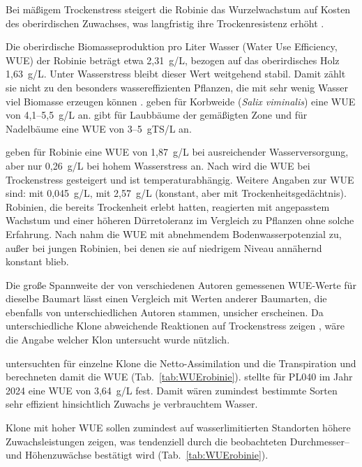 \documentclass[twocolumn]{scrartcl}
\begin{document}
Bei mäßigem Trockenstress steigert die Robinie das Wurzelwachstum auf Kosten des oberirdischen Zuwachses, was langfristig ihre Trockenresistenz erhöht \citep{yang2018robinie}.

Die oberirdische Biomasseproduktion pro Liter Wasser (Water Use Efficiency, WUE) der Robinie beträgt etwa 2,31~g/L, bezogen auf das oberirdisches Holz 1,63~g/L. Unter Wasserstress bleibt dieser Wert weitgehend stabil. Damit zählt sie nicht zu den besonders wassereffizienten Pflanzen, die mit sehr wenig Wasser viel Biomasse erzeugen können \citep{mantovani2014robinieWasser}. \citet{lindroth1994wasserverbrauchWeide} geben für Korbweide (\emph{Salix viminalis}) eine WUE von 4,1--5,5~g/L an.
\citet{lacher2001OekophysiologieDerPflanzen} gibt für Laubbäume der gemäßigten Zone und für Nadelbäume eine WUE von 3--5~gTS/L an.

\citet{ombodi2022robinieWasserverbrauch} geben für Robinie eine WUE von 1,87~g/L bei ausreichender Wasserversorgung, aber nur 0,26~g/L bei hohem Wasserstress an. Nach \citet{veste2013robinie} wird die WUE bei Trockenstress gesteigert und ist temperaturabhängig. Weitere Angaben zur WUE sind: \citet{raper1992robinieWasserverbrauch} mit 0,045~g/L, \citet{mantovani2014robinieWue} mit 2,57~g/L (konstant, aber mit Trockenheitsgedächtnis). Robinien, die bereits Trockenheit erlebt hatten, reagierten mit angepasstem Wachstum und einer höheren Dürretoleranz im Vergleich zu Pflanzen ohne solche Erfahrung.
Nach \citet{wang2007robinie} nahm die WUE mit abnehmendem Bodenwasserpotenzial zu, außer bei jungen Robinien, bei denen sie auf niedrigem Niveau annähernd konstant blieb.

Die große Spannweite der von verschiedenen Autoren gemessenen WUE-Werte für dieselbe Baumart lässt einen Vergleich mit Werten anderer Baumarten, die ebenfalls von unterschiedlichen Autoren stammen, unsicher erscheinen.
Da unterschiedliche Klone abweichende Reaktionen auf Trockenstress zeigen \citep{mapelli2019robinieTrockenstress}, wäre die Angabe welcher Klon untersucht wurde nützlich.

\citet{abri2022robinieTrokenresistenz,abri2023robiieWasser,abri2023robinieDroughtTolerance} untersuchten für einzelne Klone die Netto-Assimilation und die Transpiration und berechneten damit die WUE (Tab.~\ref{tab:WUErobinie}). \citet{abri2025robinieTrockenheit} stellte für PL040 im Jahr 2024 eine WUE von 3,64~g/L fest. Damit wären zumindest bestimmte Sorten sehr effizient hinsichtlich Zuwachs je verbrauchtem Wasser.

Klone mit hoher WUE sollen zumindest auf wasserlimitierten Standorten höhere Zuwachsleistungen zeigen, was tendenziell durch die beobachteten Durchmesser-- und Höhenzuwächse bestätigt wird (Tab.~\ref{tab:WUErobinie}).
\end{document}
